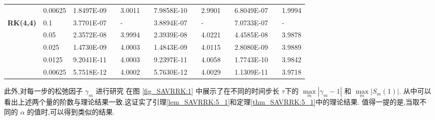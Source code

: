 \begin{table}[H]
\begin{tabular}{lllllrlrlrlrlrl}
\multicolumn{2}{l}{} & \multicolumn{2}{l}{0.00625} & 1.8497E-09 &       & 3.0011  &       & 7.9858E-10 &       & 2.9901  &       & 6.8049E-07 &       & 1.9994  \\
\multicolumn{2}{l}{\multirow{5}[1]{*}{\textbf{RK(4,4)}}} & \multicolumn{2}{l}{0.1} & 3.7701E-07 &       & -     &       & 3.8894E-07 &       & -     &       & 7.0733E-07 &       & - \\
\multicolumn{2}{l}{} & \multicolumn{2}{l}{0.05} & 2.3572E-08 &       & 3.9994  &       & 2.3939E-08 &       & 4.0221  &       & 4.4585E-08 &       & 3.9878  \\
\multicolumn{2}{l}{} & \multicolumn{2}{l}{0.025} & 1.4730E-09 &       & 4.0003  &       & 1.4843E-09 &       & 4.0115  &       & 2.8080E-09 &       & 3.9889  \\
\multicolumn{2}{l}{} & \multicolumn{2}{l}{0.0125} & 9.2041E-11 &       & 4.0003  &       & 9.2397E-11 &       & 4.0058  &       & 1.7743E-10 &       & 3.9842  \\
\multicolumn{2}{l}{} & \multicolumn{2}{l}{0.00625} & 5.7518E-12 &       & 4.0002  &       & 5.7630E-12 &       & 4.0029  &       & 1.1309E-11 &       & 3.9718  \\
\bottomrule
\end{tabular}%
\label{tab_SAVRRK:6-1}%
\end{table}%
此外,对每一步的松弛因子 $\gamma_m$ 进行研究
在图 \ref{fig_SAVRRK:1} 中展示了在不同的时间步长 $\tau$下的 $\max\limits _m\left|\gamma_m-1\right|$ 和 $\max\limits _m\left|S_m(1)\right|$.
从中可以看出上述两个量的阶数与理论结果一致.这证实了引理\ref{lem_SAVRRK:5_1}和定理\ref{thm_SAVRRK:5_1}中的理论结果.
值得一提的是,当取不同的 $\alpha$ 的值时,可以得到类似的结果.%

